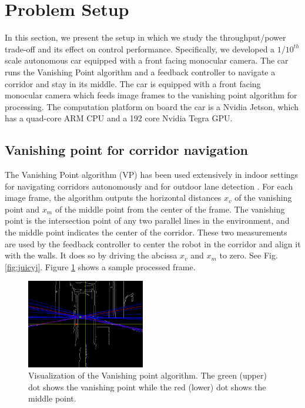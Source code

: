 \section{Problem Setup}
\label{sec:problemSetup}
In this section, we present the setup in which we study the throughput/power trade-off and its effect on control performance. 
Specifically, we developed a $1/10^{th}$ scale autonomous car equipped with a front facing monocular camera.
The car runs the Vanishing Point algorithm \cite{VP1,VP2} and a feedback controller to navigate a corridor and stay in its middle.
The car is equipped with a front facing monocular camera which feeds image frames to the vanishing point algorithm for processing.
The computation platform on board the car is a Nvidia Jetson, which has a quad-core ARM CPU and a 192 core Nvidia Tegra GPU.


\subsection{Vanishing point for corridor navigation}
\label{sec:vp}
The Vanishing Point algorithm (VP) \cite{VP1} has been used extensively in indoor settings for navigating corridors autonomously \cite{VP2, VP3} and for outdoor lane detection \cite{gallagher2002ground}.
For each image frame, the algorithm outputs the horizontal distances $x_v$ of the vanishing point and $x_m$ of the middle point from the center of the frame. 
The vanishing point is the intersection point of any two parallel lines in the environment, and the middle point indicates the center of the corridor. 
These two measurements are used by the feedback controller to center the robot in the corridor and align it with the walls. 
It does so by driving the abcissa $x_v$ and $x_m$ to zero. 
See Fig. \ref{fig:juicyj}.
Figure \ref{fig:vp_viz} shows a sample processed frame.

\begin{figure}[t]
\centering
\includegraphics[width=0.46\textwidth]{Figs/vpmpimages/image_23_-30_-51.png}
\caption{Visualization of the Vanishing point algorithm. The green (upper) dot shows the vanishing point while the red (lower) dot shows the middle point.}
\label{fig:vp_viz} %
\end{figure}

